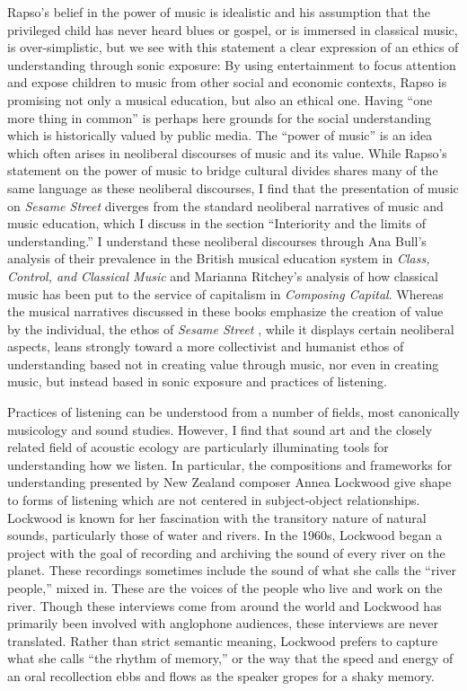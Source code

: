 \documentclass[12pt,letterpaper]{article}
\newcommand{\ses}{\textit{Sesame Street }}
\begin{document}
	Rapso's belief in the power of music is idealistic and his assumption
	that the privileged child has never heard blues or gospel, or is 
	immersed in classical music, is over-simplistic, but we see with this 
	statement a clear expression of
	an ethics of understanding through sonic exposure: 
	By using entertainment to focus attention and expose children to music 
	from other social and economic contexts,
	Rapso is promising not only a musical education, but also an ethical 
	one. Having ``one more thing in common'' is perhaps here grounds for 
	the social understanding which is historically valued by public media.  
	The ``power of music'' is an idea which often arises in neoliberal 
	discourses of music and its value. While Rapso's statement on the power
	of music to bridge cultural divides shares many of the same language
	as these neoliberal  discourses, I find that the presentation of music
	on \textit{Sesame Street} diverges from the standard neoliberal
	narratives of music and music education, which I discuss in the section
	``Interiority and the limits of understanding.'' I understand these 
	neoliberal discourses through
	Ana Bull's analysis of their prevalence in the British musical
	education system in \textit{Class, Control, and Classical Music} and
	Marianna Ritchey's analysis of how classical music has been put to the
	service of capitalism in \textit{Composing Capital}. Whereas the musical
	narratives discussed in these books emphasize the creation of 
	value by the individual, the ethos of \ses, while it displays certain
	neoliberal aspects, leans strongly toward a more collectivist and 
	humanist ethos of understanding based not in creating value through
	music, nor even in creating music, but instead 
	based in sonic exposure and practices of listening.  

	Practices of listening can be understood from a number of fields,
	most canonically musicology and sound studies. However, I find that 
	sound art and the closely related field of acoustic ecology are 
	particularly illuminating tools for understanding how we listen. 
	In particular, the compositions and frameworks for 
	understanding presented by New Zealand composer Annea Lockwood give 
	shape to forms of listening which are not centered in subject-object 
	relationships.	Lockwood is known for her 
	fascination with the transitory nature of natural sounds, particularly 
	those of water and rivers. In the 1960s, Lockwood began a project with
	the goal of recording and archiving the sound of every river on the 
	planet.\autocite[117]{Rodgers} These recordings sometimes include the 
	sound of what she calls the ``river people,'' mixed in. These are the 	
	voices of the people who live and work on the 
	river.\autocite[121]{Rodgers} Though these interviews come from around 	
	the world and Lockwood has primarily been involved with anglophone 
	audiences, these interviews are never translated. Rather than strict 
	semantic meaning, Lockwood prefers to capture what she calls ``the 
	rhythm of memory,'' or the way that the speed and energy of an oral 
	recollection ebbs and flows as the speaker gropes for a shaky 
	memory.\autocite[122]{Rodgers}  
\end{document}
